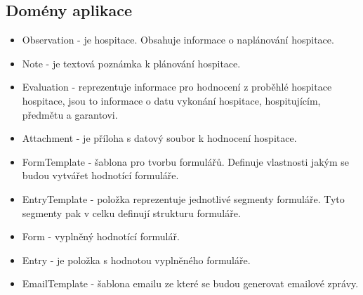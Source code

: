 \subsection{Domény aplikace}
\begin{itemize}
\item Observation - je hospitace. Obsahuje informace o naplánování hospitace. 
\item Note - je textová poznámka k plánování hospitace.
\item Evaluation - reprezentuje informace pro hodnocení z proběhlé hospitace hospitace, jsou to informace o datu vykonání hospitace, hospitujícím, předmětu a garantovi.
\item Attachment - je příloha s datový soubor k hodnocení hospitace.
\item FormTemplate - šablona pro tvorbu formulářů. Definuje vlastnosti jakým se budou vytvářet hodnotící formuláře.
\item EntryTemplate - položka reprezentuje jednotlivé segmenty formuláře. Tyto segmenty pak v celku definují strukturu formuláře.
\item Form - vyplněný hodnotící formulář.
\item Entry - je položka s hodnotou vyplněného formuláře.
\item EmailTemplate - šablona emailu ze které se budou generovat emailové zprávy.
\end{itemize}

